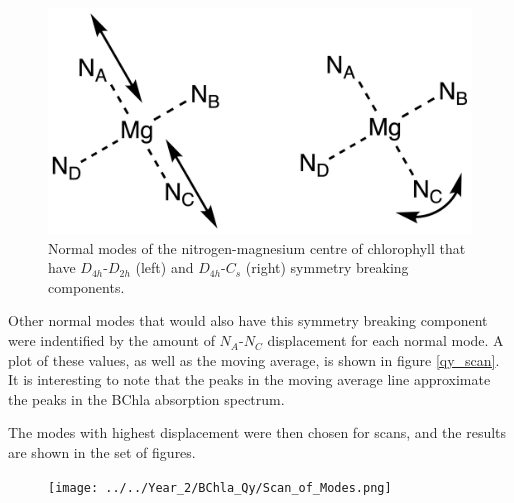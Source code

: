 \begin{figure}[h]
    \centering
    \includegraphics[]{chapters/chapter03/D4h_symmetry.png}
    \caption{Normal modes of the nitrogen-magnesium centre of chlorophyll that have
    $D_{4h}$-$D_{2h}$ (left) and $D_{4h}$-$C_{s}$ (right) symmetry breaking components.}
    \label{fig:D4_sym_breaking}
\end{figure}

Other normal modes that would also have this symmetry breaking component were indentified
by the amount of $N_A$-$N_C$ displacement for each normal mode. A plot of these
values, as well as the moving average, is shown in figure \ref{qy_scan}.
It is interesting to note that the peaks in the moving average line approximate
the peaks in the BChla absorption spectrum.

The modes with highest displacement were then chosen for scans, and the results
are shown in the set of figures.

\begin{figure}
    \texttt{[image: ../../Year\_2/BChla\_Qy/Scan\_of\_Modes.png]}
    \label{fig:qy_scan}
\end{figure}

